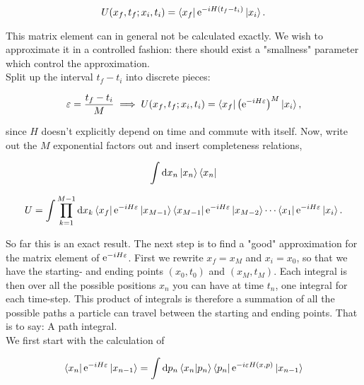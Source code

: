 \begin{equation*}
    U(x_{f}, t_{f} ; x_{i}, t_{i}) = \bra{x_{f}}\mathrm{e}^{-iH(t_{f} - t_{i})}\ket{x_{i}}.
\end{equation*}

This matrix element can in general not be calculated exactly. We wish to approximate it in a controlled fashion: there should exist a "smallness" parameter which control the approximation. \\

Split up the interval $t_{f} - t_{i}$ into discrete pieces: 

\begin{equation*}
    \varepsilon = \frac{t_{f} - t_{i}}{M} \implies U(x_{f}, t_{f} ; x_{i}, t_{i}) = \bra{x_{f}}\left( \mathrm{e}^{-iH\varepsilon}\right)^{M}\ket{x_{i}},
\end{equation*}

since $H$ doesn't explicitly depend on time and commute with itself. Now, write out the $M$ exponential factors out and insert completeness relations, 

\begin{equation*}
    \int \dd x_{n} \ket{x_{n}}\bra{x_{n}}
\end{equation*}

\begin{equation*}
    U = \int \prod_{k = 1}^{M-1} \dd x_{k} \bra{x_{f}}\mathrm{e}^{-iH\varepsilon} \ket{x_{M-1}}\bra{x_{M-1}}\mathrm{e}^{-iH\varepsilon} \ket{x_{M-2}} \cdots \bra{x_{1}}\mathrm{e}^{-iH\varepsilon}\ket{x_{i}}.
\end{equation*}

So far this is an exact result. The next step is to find a "good" approximation for the matrix element of $\mathrm{e}^{-iH\varepsilon}$. First we rewrite $x_{f} = x_{M}$ and $x_{i} = x_{0}$, so that we have the starting- and ending points $(x_{0}, t_{0})$ and $(x_{M}, t_{M})$. Each integral is then over all the possible positions $x_{n}$ you can have at time $t_{n}$, one integral for each time-step. This product of integrals is therefore a summation of all the possible paths a particle can travel between the starting and ending points. That is to say: A path integral. \\

We first start with the calculation of 

\begin{equation*}
    \bra{x_{n}}\mathrm{e}^{-iH\varepsilon}\ket{x_{n-1}} = \int \dd p_{n} \bra{x_{n}}\ket{p_{n}}\bra{p_{n}}\mathrm{e}^{-i\varepsilon H(x, p)}\ket{x_{n-1}}
\end{equation*}

